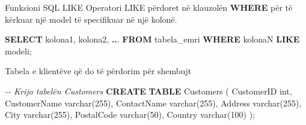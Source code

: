 \documentclass[
  ignorenonframetext,
]{beamer}
\newenvironment{Shaded}{\begin{snugshade}}{\end{snugshade}}
\newcommand{\CommentTok}[1]{\textcolor[rgb]{0.56,0.35,0.01}{\textit{#1}}}
\newcommand{\DataTypeTok}[1]{\textcolor[rgb]{0.13,0.29,0.53}{#1}}
\newcommand{\DecValTok}[1]{\textcolor[rgb]{0.00,0.00,0.81}{#1}}
\newcommand{\KeywordTok}[1]{\textcolor[rgb]{0.13,0.29,0.53}{\textbf{#1}}}
\newcommand{\NormalTok}[1]{#1}
\newcommand{\OperatorTok}[1]{\textcolor[rgb]{0.81,0.36,0.00}{\textbf{#1}}}
\begin{document}
\begin{frame}[fragile]{Funksioni SQL LIKE}
\label{funksioni-sql-like}
Operatori LIKE përdoret në klauzolën \textbf{WHERE} për të kërkuar një
model të specifikuar në një kolonë.


\begin{Shaded}
\begin{Highlighting}[]
\KeywordTok{SELECT}\NormalTok{ kolona1, kolona2, }\OperatorTok{..}\NormalTok{.}
\KeywordTok{FROM}\NormalTok{ tabela\_emri}
\KeywordTok{WHERE}\NormalTok{ kolonaN }\KeywordTok{LIKE}\NormalTok{ modeli;}
\end{Highlighting}
\end{Shaded}
\end{frame}

\begin{frame}[fragile]{Tabela e klientëve që do të përdorim për
shembujt}
\label{tabela-e-klientuxebve-quxeb-do-tuxeb-puxebrdorim-puxebr-shembujt}

\begin{Shaded}
\begin{Highlighting}[]
\CommentTok{{-}{-} Krijo tabelën Customers}
\KeywordTok{CREATE} \KeywordTok{TABLE}\NormalTok{ Customers (}
\NormalTok{    CustomerID }\DataTypeTok{int}\NormalTok{,}
\NormalTok{    CustomerName }\DataTypeTok{varchar}\NormalTok{(}\DecValTok{255}\NormalTok{),}
\NormalTok{    ContactName }\DataTypeTok{varchar}\NormalTok{(}\DecValTok{255}\NormalTok{),}
\NormalTok{    Address }\DataTypeTok{varchar}\NormalTok{(}\DecValTok{255}\NormalTok{),}
\NormalTok{    City }\DataTypeTok{varchar}\NormalTok{(}\DecValTok{255}\NormalTok{),}
\NormalTok{    PostalCode }\DataTypeTok{varchar}\NormalTok{(}\DecValTok{50}\NormalTok{),}
\NormalTok{    Country }\DataTypeTok{varchar}\NormalTok{(}\DecValTok{100}\NormalTok{)}
\NormalTok{);}
\end{Highlighting}
\end{Shaded}
\end{frame}
\end{document}
